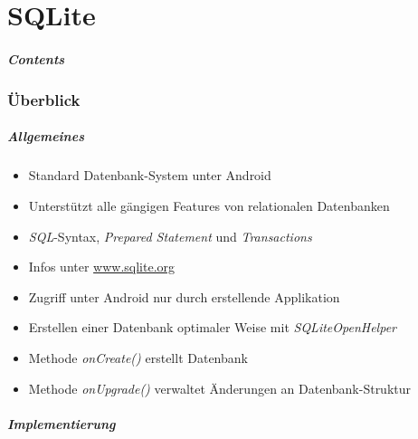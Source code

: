 \part{SQLite}
\frame{\partpage}
\begin{frame}
	\frametitle{Contents}
	\tableofcontents[]
\end{frame}

\section{Überblick}
\begin{frame}
   \frametitle{Allgemeines}
   \begin{itemize}
   	\item Standard Datenbank-System unter Android
   	\item Unterstützt alle gängigen Features von relationalen Datenbanken
   	\item \emph{SQL}-Syntax, \emph{Prepared Statement} und \emph{Transactions}
   	\item Infos unter \href{www.sqlite.org}{www.sqlite.org}
   	\item Zugriff unter Android nur durch erstellende Applikation
   	\item Erstellen einer Datenbank optimaler Weise mit \emph{SQLiteOpenHelper}
   	\item Methode \emph{onCreate()} erstellt Datenbank
   	\item Methode \emph{onUpgrade()} verwaltet Änderungen an Datenbank-Struktur
   \end{itemize}
\end{frame}

\begin{frame}
   \frametitle{Implementierung}
	
\end{frame}

